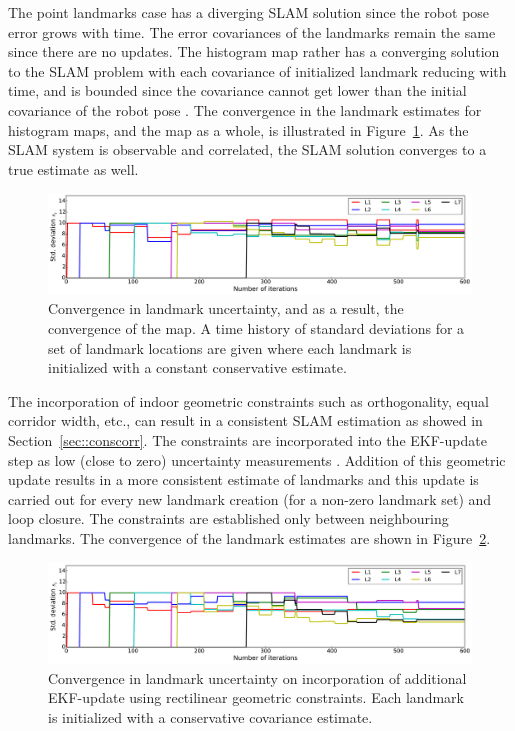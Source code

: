 The point landmarks case has a diverging SLAM solution since the robot pose error grows with time. The error covariances of the landmarks remain the same since there are no updates. The histogram map rather has a converging solution to the SLAM problem with each covariance of initialized landmark reducing with time, and is bounded since the covariance cannot get lower than the initial covariance of the robot pose \cite{dissanayake2001solution}. The convergence in the landmark estimates for histogram maps, and the map as a whole, is illustrated in Figure~\ref{cov_red}. As the SLAM system is observable and correlated, the SLAM solution converges to a true estimate as well.
\begin{figure}
\centering
\includegraphics[width=\textwidth]{./images/cov_wc22}
\caption[Convergence rate for different landmarks]{Convergence in landmark uncertainty, and as a result, the convergence of the map. A time history of standard deviations for a set of landmark locations are given where each landmark is initialized with a constant conservative estimate.}
\label{cov_red}
\end{figure} 

The incorporation of indoor geometric constraints such as orthogonality, equal corridor width, etc., can result in a consistent SLAM estimation as showed in Section~\ref{sec::conscorr}. The constraints are incorporated into the EKF-update step as low (close to zero) uncertainty measurements \cite{newman1999structure}. Addition of this geometric update results in a more consistent estimate of landmarks and this update is carried out for every new landmark creation (for a non-zero landmark set) and loop closure. The constraints are established only between neighbouring landmarks. The convergence of the landmark estimates are shown in Figure~\ref{cov_red2}.
 
\begin{figure}
\centering
\includegraphics[width=\textwidth]{./images/cov_wc21}
\caption[Increase in convergence rate through addition of rectilinear constraints]{Convergence in landmark uncertainty on incorporation of additional EKF-update using rectilinear geometric constraints. Each landmark is initialized with a conservative covariance estimate.}
\label{cov_red2}
\end{figure}


